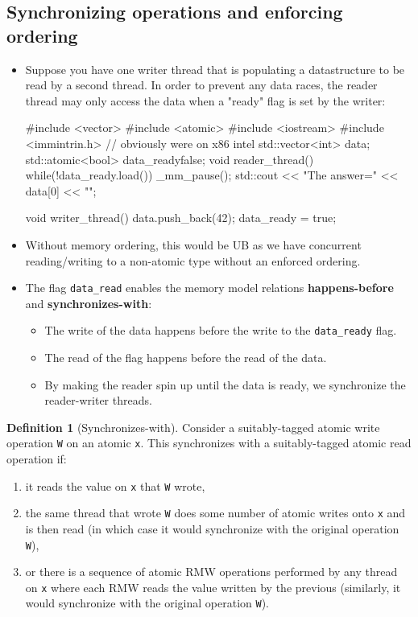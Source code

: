 \documentclass[11pt, a4paper]{article}
\theoremstyle{definition}
\newtheorem{definition}[theorem]{Definition}
\theoremstyle{remark}
\newcommand{\code}[1]{\lstinline|#1|}
\begin{document}
\subsection{Synchronizing operations and enforcing ordering}
\begin {itemize}
    \item Suppose you have one writer thread that is populating a datastructure to be read by a second thread. In order to prevent any data races, the reader thread may only access the data when a "ready" flag is set by the writer:
\begin{cppcode}
#include <vector>
#include <atomic>
#include <iostream>
#include <immintrin.h> // obviously were on x86 intel
std::vector<int> data;
std::atomic<bool> data_ready{false};
void reader_thread() {
    while(!data_ready.load()) {
        _mm_pause();
    }
    std::cout << "The answer=" << data[0] << "\n";
}

void writer_thread() {
    data.push_back(42);
    data_ready = true;
}
\end{cppcode}
    \item Without memory ordering, this would be UB as we have concurrent reading/writing to a non-atomic type without an enforced ordering.
    \item The flag \code{data_read} enables the memory model relations \textbf{happens-before} and \textbf{synchronizes-with}:
    \begin{itemize}
        \item The write of the data happens before the write to the \code{data_ready} flag.
        \item The read of the flag happens before the read of the data.
        \item By making the reader spin up until the data is ready, we synchronize the reader-writer threads.
    \end{itemize}
\end {itemize}
\begin{definition}[Synchronizes-with]
Consider a suitably-tagged atomic write operation \code{W} on an atomic \code{x}. This synchronizes with a 
suitably-tagged atomic read operation if:
\begin {enumerate}
    \item it reads the value on \code{x} that \code{W} wrote,
    \item the same thread that wrote \code{W} does some number of atomic writes onto \code{x} and is then read (in which case it would synchronize with the original operation \code{W}),
    \item or there is a sequence of atomic RMW operations performed by any thread on \code{x} where each RMW reads the value written by the previous (similarly, it would synchronize with the original operation \code{W}).
\end {enumerate} 
\end{definition}
\end{document}
